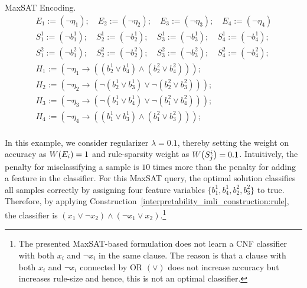 \begin{example}{MaxSAT Encoding.}
\[
\begin{split}
&E_1:= (\neg \eta_1); \quad
E_2:= (\neg \eta_2); \quad E_3:= (\neg \eta_3); \quad
E_4:= (\neg \eta_4)\\
& S_1^1 := (\neg b_1^1);\quad 
 S^1_2 := (\neg b^1_2);\quad 
 S^1_3 := (\neg b^1_3);\quad
 S^1_4 := (\neg b^1_4);\quad \\ 
& S_1^2 := (\neg b_1^2);\quad 
S^2_2 := (\neg b^2_2);\quad 
S^2_3 := (\neg b^2_3);\quad 
S^2_4 := (\neg b^2_4);\quad\\ 
& H_1:= (\neg \eta_1 \rightarrow ((b_2^1 \vee b_4^1)\wedge (b_2^2 \vee b_4^2)));\\
& H_2:= (\neg \eta_2 \rightarrow (\neg(b_2^1 \vee b_3^1) \vee \neg(b_2^2 \vee b_3^2)));\\
& H_3:= (\neg \eta_3 \rightarrow (\neg (b_1^1 \vee b_4^1) \vee \neg(b_1^2 \vee b_4^2)));\\
& H_4:= (\neg \eta_4 \rightarrow ((b_1^1 \vee b_3^1) \wedge (b_1^2 \vee b_3^2)));\\
\end{split}
\]

In this example, we consider regularizer $ \lambda = 0.1 $, thereby setting the weight on accuracy as $ W \! \left( E_i \right) = 1 $ and rule-sparsity weight as $ W \! \left( S_j^i \right) = 0.1 $. Intuitively, the penalty for misclassifying a sample is $ 10 $ times more than the penalty for adding a feature in the classifier. For this MaxSAT query, the optimal solution classifies all samples correctly by assigning four feature variables $ \{b^1_1, b^1_4, b^2_2, b^2_3\} $ to true. Therefore, by applying Construction~\ref{interpretability_imli_construction:rule}, the classifier is $ (x_1 \vee \neg x_2)  \wedge (\neg x_1 \vee x_2) $.\footnote{The presented MaxSAT-based formulation does not learn a CNF classifier with both $ x_i $ and $ \neg x_i $ in the same clause. The reason is that a clause with both $ x_i $ and $ \neg x_i $ connected by OR $ (\vee) $ does not increase accuracy but increases rule-size and hence, this is not an optimal classifier.}
	
\end{example}
	
	
